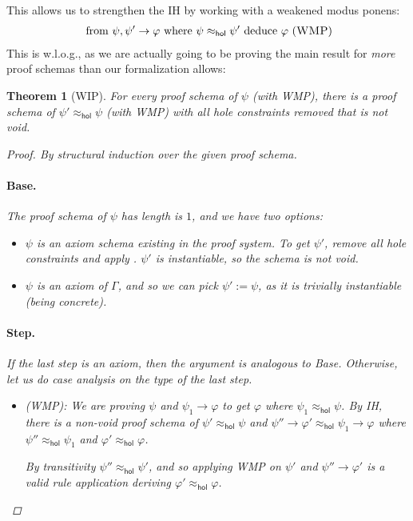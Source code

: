 \documentclass{article}
\numberwithin{deff}{section}
\numberwithin{lemma*}{section}
\newtheorem{theorem*}{Theorem}
\newcommand{\prule}[1]{(\textsc{#1})}
\newcommand{\Hol}{\mathsf{hol}}
\begin{document}
This allows us to strengthen the IH by working with a weakened modus ponens:
\begin{align*}
\text{ from }\psi, \psi' \to \varphi \text{ where }\psi \approx_\Hol \psi'\text { deduce } \varphi\ \prule{WMP}
\end{align*}
This is w.l.o.g., as we are actually going to be proving the main result for \emph{more} proof schemas than our formalization allows:
\begin{theorem*}[WIP]
  For every proof schema of $\psi$ (with WMP), there is a proof schema of $\psi' \approx_\Hol \psi$ (with WMP) with all hole constraints removed that is not void.
  \begin{proof}
    By structural induction over the given proof schema.

    \paragraph{Base.} The proof schema of $\psi$ has length is $1$, and we have two options:
    \begin{itemize}
      \item $\psi$ is an axiom schema existing in the proof system.
      To get $\psi'$, remove all hole constraints and apply .
      $\psi'$ is instantiable, so the schema is not void.

      \item $\psi$ is an axiom of $\Gamma$, and so we can pick $\psi' := \psi$, as it is trivially instantiable (being concrete).
    \end{itemize}

    \paragraph{Step.} If the last step is an axiom, then the argument is analogous to Base.
    Otherwise, let us do case analysis on the type of the last step.

    \begin{itemize}
      \item (WMP): We are proving $\psi$ and $\psi_1 \to \varphi$ to get $\varphi$ where $\psi_1 \approx_\Hol \psi$.
      By IH, there is a non-void proof schema of $\psi' \approx_\Hol \psi$ and $\psi'' \to \varphi' \approx_\Hol \psi_1 \to \varphi$ where $\psi'' \approx_\Hol \psi_1$ and $\varphi' \approx_\Hol \varphi$.

      By transitivity $\psi'' \approx_\Hol \psi'$, and so applying WMP on $\psi'$ and $\psi'' \to \varphi'$ is a valid rule application deriving $\varphi' \approx_\Hol \varphi$.


\end{itemize}
\end{proof}
\end{theorem*}
\end{document}
